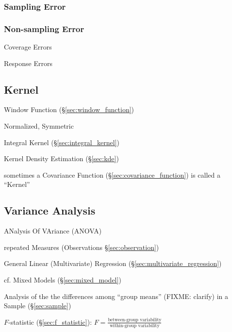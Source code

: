\subsubsection{Sampling Error}\label{sec:sampling_error}

\subsubsection{Non-sampling Error}\label{sec:nonsampling_error}

Coverage Errors

Response Errors



\subsection{Kernel}\label{sec:distribution_kernel}

Window Function (\S\ref{sec:window_function})

Normalized, Symmetric

\fist Integral Kernel (\S\ref{sec:integral_kernel})

\fist Kernel Density Estimation (\S\ref{sec:kde})

\fist sometimes a Covariance Function (\S\ref{sec:covariance_function}) is
called a ``Kernel''



\subsection{Variance Analysis}\label{sec:variance_analysis}

ANalysis Of VAriance (ANOVA)

repeated Measures (Observations \S\ref{sec:observation})

General Linear (Multivariate) Regression (\S\ref{sec:multivariate_regression})

cf. Mixed Models (\S\ref{sec:mixed_model})

Analysis of the the differences among ``group means'' (FIXME: clarify) in a
Sample (\S\ref{sec:sample})

$F$-statistic (\S\ref{sec:f_statistic}):
$F = \frac{\text{between-group variability}}{\text{within-group variability}}$

